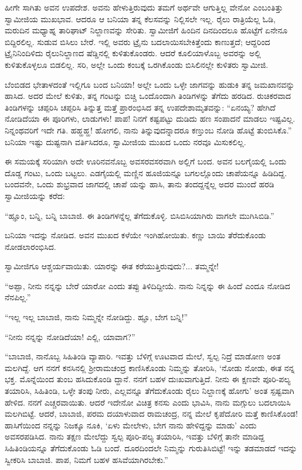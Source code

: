 ಹೀಗೇ ಸಾಗಿತು ಅವನ ಉಪದೇಶ. ಅವನು ಹೇಳುತ್ತಿರುವುದು ತಮಗೆ ಅರ್ಥವೇ ಆಗುತ್ತಿಲ್ಲ ವೇನೋ ಎಂಬಂತಿತ್ತು ಸ್ವಾಮೀಜಿಯ ಮುಖಭಾವ. ಆದರೂ ಆ ಬನಿಯಾ ತನ್ನ ಕೆಲಸವನ್ನು ನಿಲ್ಲಿಸಲೇ ಇಲ್ಲ. ರೈಲು ರಾತ್ರಿಯೆಲ್ಲ ಓಡಿ, ಮರುದಿನ ಮಧ್ಯಾಹ್ನ ತಾರಿಘಾಟ್ ನಿಲ್ದಾಣವನ್ನು ಸೇರಿತು. ಸ್ವಾಮೀಜಿಗೆ ಹಿಂದಿನ ದಿನದಿಂದಲೂ ಹೊಟ್ಟೆಗೆ ಏನೇನೂ ಬಿದ್ದಿರಲಿಲ್ಲ. ಸುಡುವ ಬಿಸಿಲು ಬೇರೆ. ಇಲ್ಲಿ ಅವರು ಟ್ರೈನು ಬದಲಾಯಿಸಬೇಕಿತ್ತೆಂದು ಕಾಣುತ್ತದೆ; ಆದ್ದರಿಂದ ಟ್ರೈನಿನಿಂದಿಳಿದು ರೈಲುನಿಲ್ದಾಣದ ಷೆಡ್ಡಿನಲ್ಲಿ ಕುಳಿತುಕೊಂಡರು. ಆದರೆ ಕೂಲಿಯಾಳೊಬ್ಬ ಅವರನ್ನು ಅಲ್ಲಿ ಕುಳಿತುಕೊಳ್ಳಲೂ ಬಿಡಲಿಲ್ಲ. ಸರಿ, ಅಲ್ಲೇ ಒಂದು ಕಂಬಕ್ಕೆ ಒರಗಿಕೊಂಡು ಬಿಸಿಲಿನಲ್ಲೇ ಕುಳಿತರು ಸ್ವಾಮೀಜಿ.

ಬೆಂಬಿಡದ ಭೇತಾಳದಂತೆ ಇಲ್ಲಿಗೂ ಬಂದ ಬನಿಯಾ! ಅಲ್ಲೇ ಒಂದು ಒಳ್ಳೇ ಜಾಗವನ್ನು ಹುಡುಕಿ ತನ್ನ ಜಮಖಾನವನ್ನು ಹಾಸಿದ. ಅದರ ಮೇಲೆ ಕುಳಿತು, ತನ್ನ ಗಂಟನ್ನು ಬಿಚ್ಚಿ ಒಂದೊಂದಾಗಿ ತಿಂಡಿಗಳನ್ನು ತೆಗೆದು ಹರಡಿದ. ರುಚಿಕರವಾದ ತಿಂಡಿಗಳನ್ನು ಚಪ್ಪರಿಸಿ ಚಪ್ಪರಿಸಿ ತಿನ್ನುತ್ತ ಮತ್ತೆ ಪ್ರಾರಂಭಿಸಿದ ತನ್ನ ಉಪದೇಶಾಮೃತವನ್ನು: “ಏನಯ್ಯ? ಹೇಗಿದೆ ನೋಡಿದೆಯಾ ಈ ಪೂರಿಗಳು, ಲಾಡುಗಳು! ಪಾಪ! ನಿನಗೆ ಕಷ್ಟಪಟ್ಟು ದುಡಿದು ಹಣ ಸಂಪಾದನೆ ಮಾಡಲು ಇಷ್ಟವಿಲ್ಲ. ನಿನ್ನಂಥವರಿಗೆ ಇದೇ ಗತಿ. ಹಹ್ಹಹ್ಹ! ಹೋಗಲಿ, ನಾನು ತಿನ್ನುವುದನ್ನಾದರೂ ಕಣ್ತುಂಬ ನೋಡಿ ಹೊಟ್ಟೆ ತುಂಬಿಸಿಕೊ.” ಬನಿಯಾ ಇಷ್ಟು ದುಷ್ಟನಾಗಿ ವರ್ತಿಸಿದರೂ, ಸ್ವಾಮೀಜಿಯ ಮುಖದ ಒಂದು ನರವೂ ಮಿಸುಕಲಿಲ್ಲ.

ಈ ಸಮಯಕ್ಕೆ ಸರಿಯಾಗಿ ಅದೇ ಊರಿನವನೊಬ್ಬ ಅವಸರವಸರವಾಗಿ ಅಲ್ಲಿಗೆ ಬಂದ. ಅವನ ಬಲಗೈಯಲ್ಲಿ ಒಂದು ದೊಡ್ಡ ಗಂಟು, ಒಂದು ಬಟ್ಟಲು. ಎಡಗೈಯಲ್ಲಿ ಮಣ್ಣಿನ ಹೂಜಿಯನ್ನೂ ಬಗಲಲ್ಲೊಂದು ಚಾಪೆಯನ್ನೂ ಹಿಡಿದಿದ್ದ. ಬಂದವನೇ, ಒಂದು ಶುಭ್ರವಾದ ಜಾಗದಲ್ಲಿ ಚಾಪೆ ಯನ್ನು ಹಾಸಿ, ತಾನು ತಂದದ್ದನ್ನೆಲ್ಲ ಅದರ ಮುಂದೆ ಹರಡಿ ಸ್ವಾಮೀಜಿಯನ್ನು ಕರೆದ:

“ಹ್ಞೂಂ, ಬನ್ನಿ, ಬನ್ನಿ ಬಾಬಾಜಿ. ಈ ತಿಂಡಿಗಳನ್ನೆಲ್ಲ ತೆಗೆದುಕೊಳ್ಳಿ. ಬಿಸಿಬಿಸಿಯಾಗಿರು ವಾಗಲೇ ಮುಗಿಸಿಬಿಡಿ.”

ಬನಿಯಾ ಇದನ್ನು ನೋಡಿದ. ಅವನ ಮುಖದ ಕಳೆಯೇ ಇಂಗಿಹೋಯಿತು. ಕಣ್ಣು ಬಾಯಿ ತೆರೆದುಕೊಂಡು ನೋಡಲಾರಂಭಿಸಿದ.

ಸ್ವಾಮೀಜಿಗೂ ಆಶ್ಚರ್ಯವಾಯಿತು. ಯಾರನ್ನು ಈತ ಕರೆಯುತ್ತಿರುವುದು?... ತಮ್ಮನ್ನೇ!

“ಅಪ್ಪಾ, ನೀನು ನನ್ನನ್ನು ಬೇರೆ ಯಾರೋ ಎಂದು ತಪ್ಪು ತಿಳಿದಿದ್ದೀಯೆ. ನಾನು ನಿನ್ನನ್ನು ಈ ಹಿಂದೆ ಎಂದೂ ನೋಡಿದ ನೆನಪಿಲ್ಲ.”

“ಇಲ್ಲ ಇಲ್ಲ ಬಾಬಾಜಿ, ನಾನು ನಿಮ್ಮನ್ನೇ ನೋಡಿದ್ದು. ಹ್ಞೂ, ಬೇಗ ಬನ್ನಿ!”

“ನೀನು ನನ್ನನ್ನು ನೋಡಿದೆಯಾ! ಎಲ್ಲಿ, ಯಾವಾಗ?”

“ಬಾಬಾಜಿ, ನಾನೊಬ್ಬ ಸಿಹಿತಿಂಡಿ ವ್ಯಾಪಾರಿ. ಇವತ್ತು ಬೆಳಿಗ್ಗೆ ಊಟವಾದ ಮೇಲೆ, ಸ್ವಲ್ಪ ನಿದ್ರೆ ಮಾಡೋಣ ಅಂತ ಮಲಗಿದ್ದೆ. ಆಗ ನನಗೆ ಕನಸಿನಲ್ಲಿ ಶ್ರೀರಾಮಚಂದ್ರ ಕಾಣಿಸಿಕೊಂಡು ನಿಮ್ಮನ್ನು ತೋರಿಸಿ, ‘ನೋಡು ನೋಡು, ಈತ ನನ್ನ ಭಕ್ತ. ಮೊನ್ನೆಯಿಂದ ತುಂಬ ಹಸಿದುಕೊಂಡಿ ದ್ದಾನೆ. ನನಗೆ ಬಹಳ ದುಃಖವಾಗುತ್ತಿದೆ. ನೀನು ಈ ಕ್ಷಣವೇ ಪೂರಿ-ಪಲ್ಯ ತಯಾರಿಸಿ, ಸಿಹಿತಿಂಡಿ, ಒಳ್ಳೇ ತಂಪು ನೀರು, ಎಲ್ಲವನ್ನೂ ತೆಗೆದುಕೊಂಡು ರೈಲು ನಿಲ್ದಾಣಕ್ಕೆ ಹೋಗು’ ಅಂತ ಸ್ಪಷ್ಟವಾಗಿ ಹೇಳಿದ. ನನಗೆ ಎಚ್ಚರವಾಯಿತು. ಆದರೆ ಇದೇನೋ ವಿಚಿತ್ರ ಕನಸು ಎಂದು ಭಾವಿಸಿ, ನಾನು ಮಗ್ಗುಲು ಬದಲಾಯಿಸಿ ಮಲಗಿಬಿಟ್ಟೆ. ಆದರೆ, ಬಾಬಾಜಿ, ಪರಮ ದಯಾಳುವಾದ ರಾಮಚಂದ್ರ, ನನ್ನ ಮೇಲೆ ಕೃಪೆದೋರಿ ಮತ್ತೆ ಕಾಣಿಸಿಕೊಂಡ! ಹಾಸಿಗೆಯಿಂದ ನನ್ನನ್ನು ನಿಜಕ್ಕೂ ನೂಕಿ, ‘ಏಳು ಮೇಲೇಳು, ಬೇಗ ನಾನು ಹೇಳಿದ್ದನ್ನು ಮಾಡು’ ಎಂದು ಅವಸರಪಡಿಸಿದ. ನಾನು ತಕ್ಷಣ ಮೇಲೆದ್ದು ಸ್ವಲ್ಪ ಪೂರಿ-ಪಲ್ಯ ತಯಾರಿಸಿ, ಇವತ್ತು ಬೆಳಿಗ್ಗೆ ತಾನೇ ಮಾಡಿದ್ದ ಸಿಹಿತಿಂಡಿಯನ್ನೂ ತೆಗೆದುಕೊಂಡು ಓಡಿ ಬಂದೆ. ದೂರದಿಂದಲೇ ನಿಮ್ಮನ್ನು ಗುರುತಿಸಿಬಿಟ್ಟೆ! ಇನ್ನು ತಡಮಾಡದೆ ಇದನ್ನು ಸ್ವೀಕರಿಸಿ ಬಾಬಾಜಿ. ಪಾಪ, ನಿಮಗೆ ಬಹಳ ಹಸಿವೆಯಾಗಿರಬೇಕು.”

